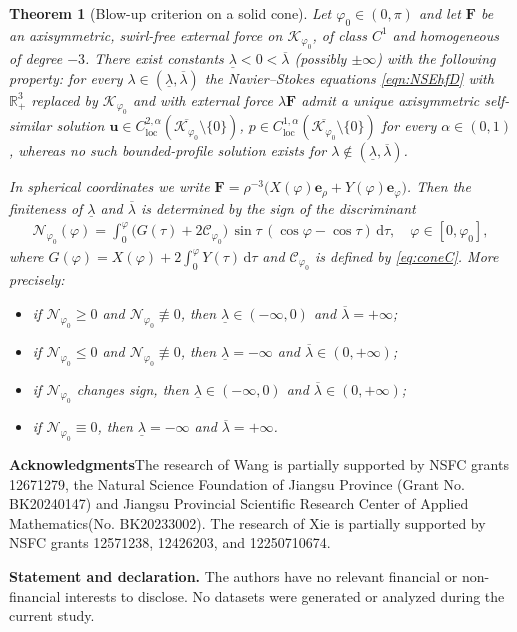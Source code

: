 \documentclass{amsart}
\newtheorem{theorem}{Theorem}[section]
\newcommand{\vp}{\varphi}
\newcommand{\Bu}{{\boldsymbol{u}}}
\newcommand{\Be}{{\boldsymbol{e}}}
\newcommand{\BF}{{\boldsymbol{F}}}
\newcommand{\rmd}{\mathrm{d}}
\begin{document}
\begin{theorem}[Blow-up criterion on a solid cone]
Let $\varphi_0\in(0,\pi)$ and let $\BF$ be an axisymmetric, swirl-free external force on $\mathcal{K}_{\varphi_0}$, of class $C^{1}$ and homogeneous of degree $-3$.
There exist constants $\underline{\lambda}<0<\overline{\lambda}$ (possibly $\pm\infty$) with the following property: for every $\lambda\in(\underline{\lambda},\overline{\lambda})$ the Navier--Stokes equations \eqref{eqn:NSEhfD} with $\mathbb{R}^{3}_{+}$ replaced by $\mathcal{K}_{\varphi_0}$ and with external force $\lambda\BF$ admit a unique axisymmetric self-similar solution
$\Bu\in C^{2,\alpha}_{\mathrm{loc}}(\overline{\mathcal K_{\varphi_0}}\setminus\{0\})$, $p\in C^{1,\alpha}_{\mathrm{loc}}(\overline{\mathcal K_{\varphi_0}}\setminus\{0\})$ for every $\alpha\in(0,1)$, whereas no such bounded-profile solution exists for $\lambda\notin(\underline{\lambda},\overline{\lambda})$.

In spherical coordinates we write $\BF = \rho^{-3}\bigl( X(\varphi)\Be_{\rho} + Y(\varphi)\Be_{\varphi} \bigr)$.
Then the finiteness of $\underline{\lambda}$ and $\overline{\lambda}$ is determined by the sign of the discriminant
\begin{align*}
\mathcal{N}_{\vp_0}(\varphi)=\int_{0}^{\varphi}
\bigl(G(\tau)+2\mathcal{C}_{\varphi_0}\bigr)\,\sin\tau\,(\cos\varphi-\cos\tau)\,\rmd\tau,
\quad \varphi \in [0,\varphi_0],
\end{align*}
where $G(\varphi)=X(\varphi)+2\int_{0}^{\varphi} Y(\tau)\,\rmd\tau$ and $\mathcal{C}_{\varphi_0}$ is defined by \eqref{eq:coneC}. More precisely:
\begin{itemize}
\item if $\mathcal{N}_{\vp_0}\ge0$ and $\mathcal{N}_{\vp_0}\not\equiv0$, then $\underline{\lambda}\in(-\infty,0)$ and $\overline{\lambda}=+\infty$;

\item if $\mathcal{N}_{\vp_0}\le0$ and $\mathcal{N}_{\vp_0}\not\equiv0$, then $\underline{\lambda}=-\infty$ and $\overline{\lambda}\in(0,+\infty)$;

\item if $\mathcal{N}_{\vp_0}$ changes sign, then $\underline{\lambda}\in(-\infty,0)$ and $\overline{\lambda}\in(0,+\infty)$;
\item if $\mathcal{N}_{\vp_0}\equiv0$, then $\underline{\lambda}=-\infty$ and $\overline{\lambda}=+\infty$.
\end{itemize}
\end{theorem}

\medskip

{\bf Acknowledgments}The research of Wang is partially supported by NSFC grants 12671279, the Natural Science Foundation of Jiangsu Province (Grant No. BK20240147) and Jiangsu Provincial Scientific Research Center of Applied Mathematics(No. BK20233002). The research of Xie is partially supported by  NSFC grants 12571238, 12426203, and 12250710674. 


\medskip
{\bf Statement and declaration.} The authors have no relevant financial or non-financial interests to disclose. No datasets were generated or analyzed during the current study.






\end{document}

